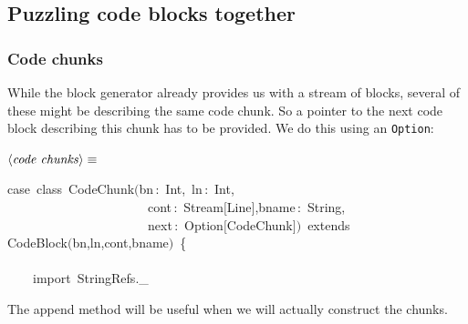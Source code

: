 \documentclass[a4paper,12pt]{article}
\begin{document}
\label{puzzle}\subsection{Puzzling code blocks together}
\subsubsection{Code chunks}
While the block generator already provides us with a stream of
blocks, several of these might be describing the same code chunk.
So a pointer to the next code block describing this chunk has to be
provided. We do this using an \texttt{Option}:

$\left<\mbox{\emph{code chunks}}\right>\equiv$
\begin{program}{\vem case}~{\vem class}~CodeChunk$($bn\,{\rm :}~Int,~ln\,{\rm :}~Int,
\\~~~~~~~~~~~~~~~~~~~~~~cont\,{\rm :}~Stream$[$Line$]$,bname\,{\rm :}~String,
\\~~~~~~~~~~~~~~~~~~~~~~next\,{\rm :}~Option$[$CodeChunk$]$$)$~{\vem extends}
\\CodeBlock$($bn,ln,cont,bname$)$~{\small\{}
\\~~~~
\\~~~~{\vem import}~StringRefs.\_
\\[0.5em]\end{program}



The append method will be useful when we will actually construct
the chunks.
\end{document}
